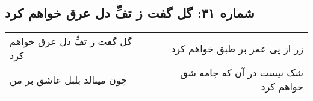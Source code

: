 \begin{center}
\section*{شماره ۳۱: گل گفت ز تفِّ دل عرق خواهم کرد}
\label{sec:031}
\begin{longtable}{l p{0.5cm} r}
گل گفت ز تفِّ دل عرق خواهم کرد
&&
زر از پی عمر بر طبق خواهم کرد
\\
چون مینالد بلبل عاشق بر من
&&
شک نیست در آن که جامه شق خواهم کرد
\\
\end{longtable}
\end{center}
